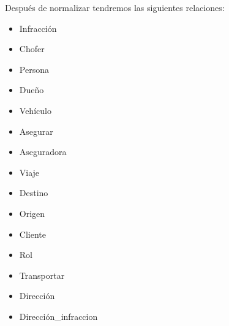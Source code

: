 \documentclass{article}
\begin{document}
Después de normalizar tendremos las siguientes relaciones:
\begin{itemize}
\item Infracción\\
\item Chofer\\
\item Persona\\
\item Dueño\\
\item Vehículo\\
\item Asegurar\\
\item Aseguradora\\
\item Viaje\\
\item Destino\\
\item Origen\\
\item Cliente\\
\item Rol\\
\item Transportar\\
\item Dirección\\
\item Dirección_infraccion\\
\\
\end{itemize}
\end{document}
